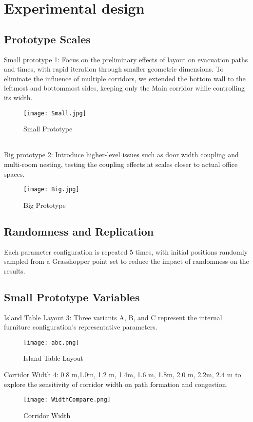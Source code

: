 \section{Experimental design}

\subsection{Prototype Scales}
Small prototype \ref{fig:small}: Focus on the preliminary effects of layout on evacuation paths and times, with rapid iteration through smaller geometric dimensions. To eliminate the influence of multiple corridors, we extended the bottom wall to the leftmost and bottommost sides, keeping only the Main corridor while controlling its width.
\begin{figure}[h]
    \centering
    \texttt{[image: Small.jpg]}
    \caption{Small Prototype}
    \label{fig:small}
\end{figure}
\\Big prototype \ref{fig:big}: Introduce higher-level issues such as door width coupling and multi-room nesting, testing the coupling effects at scales closer to actual office spaces.
\begin{figure}[h]
    \centering
    \texttt{[image: Big.jpg]}
    \caption{Big Prototype}
    \label{fig:big}
\end{figure}

\subsection{Randomness and Replication}
Each parameter configuration is repeated 5 times, with initial positions randomly sampled from a Grasshopper point set to reduce the impact of randomness on the results.

\subsection{Small Prototype Variables}
Island Table Layout \ref{fig:abc}: Three variants A, B, and C represent the internal furniture configuration's representative parameters.
\begin{figure}[h]
    \centering
    \texttt{[image: abc.png]}
    \caption{Island Table Layout}
    \label{fig:abc}
\end{figure}

Corridor Width \ref{fig:corridorwidth}: 0.8 m,1.0m, 1.2 m, 1.4m, 1.6 m, 1.8m, 2.0 m, 2.2m, 2.4 m to explore the sensitivity of corridor width on path formation and congestion.
\begin{figure}[h]
    \centering
    \texttt{[image: WidthCompare.png]}
    \caption{Corridor Width}
    \label{fig:corridorwidth}
\end{figure}

